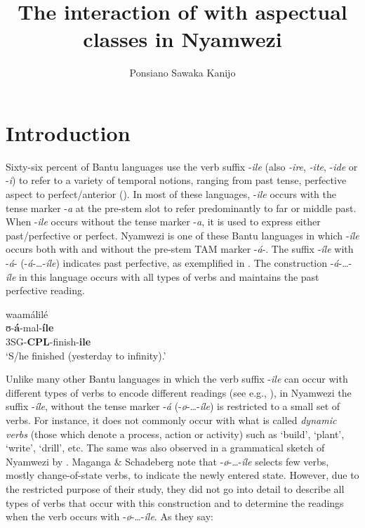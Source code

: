 \documentclass[output=paper,newtxmath,modfonts,nonflat,draftmode]{langsci/langscibook}
\author{Ponsiano Sawaka Kanijo\affiliation{University of Gothenburg}}
\title{The interaction of  with aspectual classes in Nyamwezi}
\begin{document}
\maketitle


\section{Introduction}

Sixty-six percent of Bantu languages use the verb suffix -\textit{ile} (also \textit{-ire}, \textit{-ite}, -\textit{ide} or -\textit{i}) to refer to a variety of temporal notions, ranging from past tense, perfective aspect to perfect/anterior (\citealt{Nurse2008,Botne2010}). In most of these languages, -\textit{ile} occurs with the tense marker -\textit{a} at the pre-stem slot to refer predominantly to far or middle past. When -\textit{ile} occurs without the tense marker -\textit{a}, it is used to express either past/perfective or perfect. Nyamwezi is one of these Bantu languages in which -\textit{íle} occurs both with and without the pre-stem TAM marker -\textit{á}-. The suffix -\textit{íle} with -\textit{á}- (-\textit{á}-…-\textit{íle}) indicates past perfective, as exemplified in . The construction -\textit{á}-…-\textit{íle} in this language occurs with all types of verbs and maintains the past perfective reading. 

\ea \label{ex:kanijo:1}
\glll waamálilé\\
ʊ-\textbf{á}-mal-\textbf{íle}\\
3SG-\textbf{CPL}-finish-\textbf{ile}\\
\glt ‘S/he finished (yesterday to infinity).’\\
\z

Unlike many other Bantu languages in which the verb suffix -\textit{ile} can occur with different types of verbs to encode different readings (see e.g., \citealt{Brisard2009}), in Nyamwezi the suffix -\textit{íle}, without the tense marker -\textit{á} (-\textit{ø}-…-\textit{íle}) is restricted to a small set of verbs. For instance, it does not commonly occur with what is called \textit{dynamic} \textit{verbs} (those which denote a process, action or activity) such as ‘build’, ‘plant’, ‘write’, ‘drill’, etc. The same was also observed in a grammatical sketch of Nyamwezi by \citet{Maganga1992}. Maganga \& Schadeberg note that -\textit{ø}-…-\textit{íle} selects few verbs, mostly change-of-state verbs, to indicate the newly entered state. However, due to the restricted purpose of their study, they did not go into detail to describe all types of verbs that occur with this construction and to determine the readings when the verb occurs with -\textit{ø}-…-\textit{íle}. As they say:
\end{document}
